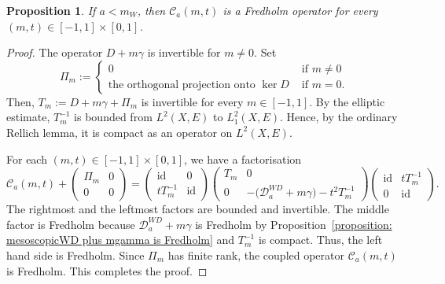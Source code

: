 \documentclass[a4paper,oneside,12pt]{amsart}
\theoremstyle{plain}
\newtheorem{proposition}[theorem]{Proposition}
\theoremstyle{definition}
\theoremstyle{remark}
\DeclareMathOperator{\id}{id}
\newcommand{\mesoscopicWilsonDiracoperator}[1][a]{\mathcal{D}_{#1}^{\mathit{WD}}}
\newcommand{\coupledoperator}[3][a]{\mathcal{C}_{#1}(#2,#3)}
\begin{document}
\begin{proposition}\label{proposition: coupled operators are fredholm}
  If $a < m_W$, then $\coupledoperator[a]{m}{t}$ is a Fredholm operator for every $(m,t) \in [-1,1] \times [0,1]$.
\end{proposition}
\begin{proof}
  The operator $D+m\gamma$ is invertible for $m \ne 0$.
  Set
  \begin{equation}
    \Pi_m := \begin{cases}
      0 & \text{ if } m \ne 0 \\
      \text{the orthogonal projection onto $\ker D$} & \text{ if } m = 0.
    \end{cases}
  \end{equation}
  Then, $T_m := D + m\gamma + \Pi_m$ is invertible for every $m \in [-1,1]$.
  By the elliptic estimate, $T_m^{-1}$ is bounded from $L^2(X,E)$ to $L^2_1(X,E)$.
  Hence, by the ordinary Rellich lemma, it is compact as an operator on $L^2(X,E)$.

  For each $(m,t) \in [-1,1] \times [0,1]$, we have a factorisation
  \begin{equation}
    \coupledoperator{m}{t}
    +
    \begin{pmatrix}
      \Pi_m & 0 \\
      0 & 0
    \end{pmatrix}
    =
    \begin{pmatrix}
      \id & 0 \\
      tT_m^{-1} & \id
    \end{pmatrix}
    \begin{pmatrix}
      T_m & 0 \\
      0 & -\bigl( \mesoscopicWilsonDiracoperator + m\gamma \bigr) - t^2 T_m^{-1}
    \end{pmatrix}
    \begin{pmatrix}
      \id & tT_m^{-1} \\
      0 & \id
    \end{pmatrix}.
  \end{equation}
The rightmost and the leftmost factors are bounded and invertible.
The middle factor is Fredholm because $\mesoscopicWilsonDiracoperator + m\gamma$ is Fredholm by Proposition~\ref{proposition: mesoscopicWD plus mgamma is Fredholm} and $T_m^{-1}$ is compact.
Thus, the left hand side is Fredholm.
Since $\Pi_m$ has finite rank, the coupled operator $\coupledoperator{m}{t}$ is Fredholm.
This completes the proof.
\end{proof}
\end{document}
